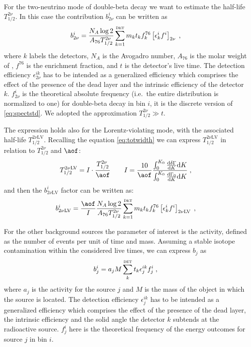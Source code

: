 \marginnote{$2\nbb$} For the two-neutrino mode of double-beta decay we want to estimate the half-life $T_{1/2}^{2\nu}$. In this case the contribution $b_{2\nu}^i$ can be written as
\begin{equation}b_{2\nu}^i=\frac{N_A\log2}{A_{76}T_{1/2}^{2\nu}}\sum_{k=1}^\textsc{det}m_kt_kf^{76}_k\left[\epsilon^i_kf^i\right]_{2\nu}\;,\end{equation}
where $k$ labels the detectors, $N_A$ is the Avogadro number, $A_{76}$ is the molar weight of , $f^{76}$ is the enrichment fraction, and $t$ is the detector's live time. The detection efficiency $\epsilon_{2\nu}^{ik}$ has to be intended as a generalized efficiency which comprises the effect of the presence of the dead layer and the intrinsic efficiency of the detector $k$. $f_{2\nu}^i$ is the theoretical absolute frequency (i.e.~the entire distribution is normalized to one) for double-beta decay in bin $i$, it is the discrete version of \ref{eq:spectstd}. We adopted the approximation $T_{1/2}^{2\nu}\gg t$.

The expression holds also for the Lorentz-violating mode, with the associated half-life $T_{1/2}^{2\nu\text{LV}}$. Recalling the equation \ref{eq:totwidth} we can express $T_{1/2}^{2\nu\text{LV}}$ in relation to $T_{1/2}^{2\nu}$ and $\aof$:
\begin{equation}T_{1/2}^{2\nu\text{LV}}=I\cdot\frac{T_{1/2}^{2\nu}}{\aof}\qquad I=\frac{10}{\aof}\frac{\int_0^{K_0}\frac{\text{d}\delta\Gamma}{\text{d}K}\text{d}K}{\int_0^{K_0}\frac{\text{d}\Gamma_0}{\text{d}K}\text{d}K}\;,\end{equation}
and then the $b_{2\nu\text{LV}}^i$ factor can be written as:
\begin{equation}b_{2\nu\text{LV}}^i=\frac{\aof}{I}\frac{N_A\log2}{A_{76}T_{1/2}^{2\nu}}\sum_{k=1}^\textsc{det}m_kt_kf^{76}_k\left[\epsilon^i_kf^i\right]_{2\nu\text{LV}}\;,\end{equation}

 For the other background sources the parameter of interest is the activity, defined as the number of events per unit of time and mass. Assuming a stable isotope contamination within the considered live times, we can express $b_j$ as
\begin{equation}b_j^i=a_jM\sum_k^\textsc{det}t_k\epsilon_j^{ik}f_j^i\;,\label{eq:extsources}\end{equation}
where $a_j$ is the activity for the source $j$ and $M$ is the mass of the object in which the source is located. The detection efficiency $\epsilon_j^{ik}$ has to be intended as a generalized efficiency which comprises the effect of the presence of the dead layer, the intrinsic efficiency and the solid angle the detector $k$ subtends at the radioactive source. $f_j^i$ here is the theoretical frequency of the energy outcomes for source $j$ in bin $i$.

